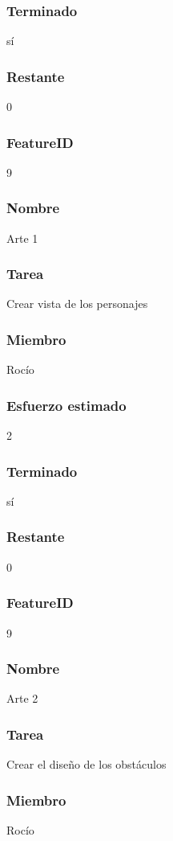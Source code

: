 \subsubsection{Terminado} sí
\subsubsection{Restante} 0


\subsubsection{FeatureID} 9
\subsubsection{Nombre} Arte 1
\subsubsection{Tarea} Crear vista de los personajes
\subsubsection{Miembro} Rocío
\subsubsection{Esfuerzo estimado} 2
\subsubsection{Terminado} sí
\subsubsection{Restante} 0



\subsubsection{FeatureID} 9
\subsubsection{Nombre} Arte 2
\subsubsection{Tarea} Crear el diseño de los obstáculos
\subsubsection{Miembro} Rocío

